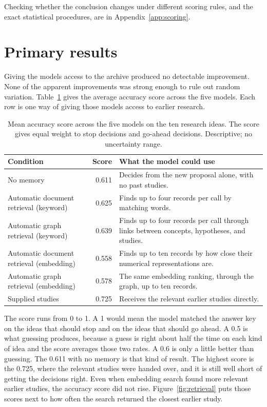 \documentclass[11pt]{article}
\begin{document}
Checking whether the conclusion changes under different scoring rules, and the exact statistical procedures, are in Appendix~\ref{app:scoring}.

\section{Primary results}
\label{sec:results}

Giving the models access to the archive produced no detectable improvement. None of the apparent improvements was strong enough to rule out random variation. Table~\ref{tab:pooled} gives the average accuracy score across the five models. Each row is one way of giving those models access to earlier research.

\begin{table}[ht]
\centering
\caption{Mean accuracy score across the five models on the ten research ideas. The score gives equal weight to stop decisions and go-ahead decisions. Descriptive; no uncertainty range.}
\label{tab:pooled}
\small
\begin{tabularx}{\linewidth}{l r X}
\toprule
Condition & Score & What the model could use \\
\midrule
No memory & 0.611 & Decides from the new proposal alone, with no past studies. \\
Automatic document retrieval (keyword) & 0.625 & Finds up to four records per call by matching words. \\
Automatic graph retrieval (keyword) & 0.639 & Finds up to four records per call through links between concepts, hypotheses, and studies. \\
Automatic document retrieval (embedding) & 0.558 & Finds up to ten records by how close their numerical representations are. \\
Automatic graph retrieval (embedding) & 0.578 & The same embedding ranking, through the graph, up to ten records. \\
Supplied studies & 0.725 & Receives the relevant earlier studies directly. \\
\bottomrule
\end{tabularx}
\end{table}

The score runs from 0 to 1. A 1 would mean the model matched the answer key on the ideas that should stop and on the ideas that should go ahead. A 0.5 is what guessing produces, because a guess is right about half the time on each kind of idea and the score averages those two rates. A 0.6 is only a little better than guessing. The 0.611 with no memory is that kind of result. The highest score is the 0.725, where the relevant studies were handed over, and it is still well short of getting the decisions right. Even when embedding search found more relevant earlier studies, the accuracy score did not rise. Figure~\ref{fig:retrieval} puts those scores next to how often the search returned the closest earlier study.
\end{document}
